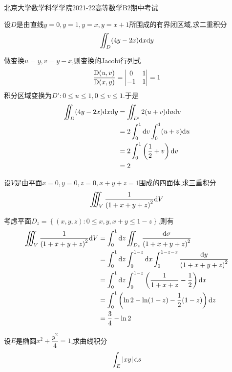 \documentclass{ctexart}
\begin{document}
\pagestyle{empty}
\begin{center}\Large
    北京大学数学科学学院2021-22高等数学B2期中考试
\end{center}
\begin{problem}[1.(10\songti{分})]
    设$D$是由直线$y=0,y=1,y=x,y=x+1$所围成的有界闭区域,求二重积分
    \[\iint_D(4y-2x)\mathrm{d} x\mathrm{d} y\]

\end{problem}
\begin{solution}
    做变换$u=y,v=y-x$,则变换的Jacobi行列式
    \[\dfrac{\text D(u,v)}{\text D(x,y)}=\begin{vmatrix}
        0&1\\-1&1
    \end{vmatrix}=1\]
    积分区域变换为$D':0\leqslant u\leqslant 1,0\leqslant v\leqslant 1$.于是
    \[\begin{aligned}
        \iint_D(4y-2x)\mathrm{d} x\mathrm{d} y
        &= \iint_{D'}2(u+v)\mathrm{d} u\mathrm{d} v \\
        &= 2\int_0^1\mathrm{d} v\int_0^1(u+v)\mathrm{d} u \\
        &= 2\int_0^1\left(\dfrac12+v\right)\mathrm{d} v \\
        &= 2
    \end{aligned}\]
\end{solution}
\begin{problem}[2.(10\songti{分})]
    设$V$是由平面$x=0,y=0,z=0,x+y+z=1$围成的四面体,求三重积分
    \[\iiint_V\dfrac{1}{\left(1+x+y+z\right)^2}\mathrm{d} V\]
    
\end{problem}
\begin{solution}
    考虑平面$D_z=\left\{(x,y,z):0\leqslant x,y,x+y\leqslant 1-z\right\}$,则有
    \[\begin{aligned}
        \iiint_V\dfrac{1}{\left(1+x+y+z\right)^2}\mathrm{d} V
        &= \int_0^1\mathrm{d} z\iint_{D_z}\dfrac{\mathrm{d}\sigma}{\left(1+x+y+z\right)^2} \\
        &= \int_0^1\mathrm{d} z\int_0^{1-z}\mathrm{d} x\int_0^{1-z-x}\dfrac{\mathrm{d} y}{\left(1+x+y+z\right)^2} \\
        &= \int_0^1\mathrm{d} z\int_0^{1-z}\left(\dfrac{1}{1+x+z}-\dfrac12\right)\mathrm{d} x \\
        &= \int_0^1\left(\ln 2-\ln(1+z)-\dfrac12(1-z)\right)\mathrm{d} z \\
        &= \dfrac34-\ln2
    \end{aligned}\]

\end{solution}
\begin{problem}[3.(10\songti{分})]
    设$E$是椭圆$x^2+\dfrac{y^2}{4}=1$,求曲线积分
    \[\int_E\left|xy\right|\mathrm{d} s\]

\end{problem}
\end{document}
